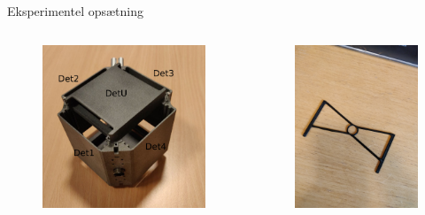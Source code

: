 \begin{frame}{Eksperimentel opsætning}
	\begin{columns}
		\begin{figure}
			\centering
			\includegraphics[width=\columnwidth]{../figures/cubepic.pdf}
		\end{figure}
		\begin{figure}
			\includegraphics[width=.9\columnwidth]{../figures/targetHolder.jpg}
		\end{figure}
	\end{columns}
\end{frame}

